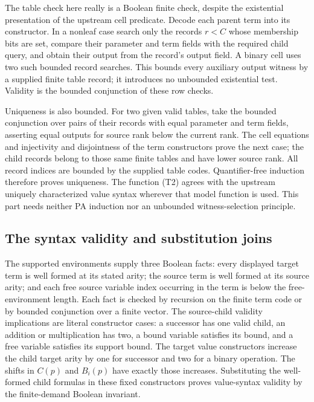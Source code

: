 The table check here really is a Boolean finite check, despite the
existential presentation of the upstream cell predicate.  Decode each
parent term into its constructor.  In a nonleaf case search only the
records $r<C$ whose membership bits are set, compare their parameter
and term fields with the required child query, and obtain their output
from the record's output field.  A binary cell uses two such bounded
record searches.  This bounds every auxiliary output witness by a
supplied finite table record; it introduces no unbounded existential
test.  Validity is the bounded conjunction of these row checks.

Uniqueness is also bounded.  For two given valid tables, take the
bounded conjunction over pairs of their records with equal parameter
and term fields, asserting equal outputs for source rank below the
current rank.  The cell equations and injectivity and disjointness of
the term constructors prove the next case; the child records belong
to those same finite tables and have lower source rank.  All record
indices are bounded by the supplied table codes.  Quantifier-free
induction therefore proves uniqueness.  The function (T2) agrees with
the upstream uniquely characterized value syntax wherever that model
function is used.  This part needs neither PA induction nor an
unbounded witness-selection principle.

\subsection{The syntax validity and substitution joins}

The supported environments supply three Boolean facts: every displayed
target term is well formed at its stated arity; the source term is well
formed at its source arity; and each free source variable index occurring
in the term is below the free-environment length.  Each fact is checked
by recursion on the finite term code or by bounded conjunction over a
finite vector.  The source-child validity implications are literal
constructor cases: a successor has one valid child, an addition or
multiplication has two, a bound variable satisfies its bound, and a
free variable satisfies its support bound.  The target value
constructors increase the child target arity by one for successor and
two for a binary operation.  The shifts in $C(p)$ and $B_i(p)$ have
exactly those increases.  Substituting the well-formed child formulas
in these fixed constructors proves value-syntax validity by the
finite-demand Boolean invariant.

